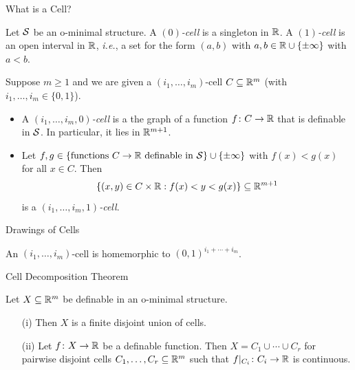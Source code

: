 \documentclass{beamer}
\begin{document}
\begin{frame}{What is a Cell?}
  \begin{definition}
    Let ${\mathcal S}$ be an o-minimal structure. 
    A \emph{$(0)$-cell} is a singleton in ${\mathbb{R}}$. A \emph{$(1)$-cell} is an open
    interval in ${\mathbb{R}}$, \textit{i.e.}, a set for the form $(a,b)$ with
    $a,b\in {\mathbb{R}}\cup\{\pm\infty\}$ with $a<b$.

    Suppose $m\ge 1$ and we are given a $(i_1,\ldots,i_m)$-cell
    $C\subseteq{\mathbb{R}}^m$
    (with $i_1,\ldots,i_m\in
    \{0,1\}$).  
    \begin{itemize}
    \item A \emph{$(i_1,\ldots,i_m,0)$-cell} is a the graph of a function
      $f\colon C\rightarrow {\mathbb{R}}$ that is definable in ${\mathcal S}$. In
      particular, it lies in ${\mathbb{R}}^{m+1}$.
    \item Let $f,g\in \{\text{functions }C\rightarrow {\mathbb{R}} \text{ definable
        in ${\mathcal S}$}\}\cup\{\pm\infty\}$  with $f(x) < g(x)$ for all $x\in C$. 
      Then
      \begin{equation*}
        \{(x,y)\in C\times {\mathbb{R}} : f(x) < y <
        g(x)  \}\subseteq{\mathbb{R}}^{m+1}
      \end{equation*}
      is a \emph{$(i_1,\ldots,i_m,1)$-cell}.
    \end{itemize}
  \end{definition}
\end{frame}

\begin{frame}{Drawings of Cells}

  \vspace{7cm}
  An $(i_1,\ldots,i_m)$-cell is homemorphic to $(0,1)^{i_1+\cdots+i_m}$.
\end{frame}

\begin{frame}{Cell Decomposition Theorem}
  \begin{theorem}
    Let $X\subseteq{\mathbb{R}}^m$ be
    definable in an o-minimal structure.
    \begin{enumerate}
    \item [(i)] Then $X$ is a
      finite disjoint union of cells.
    \item[(ii)] Let $f\colon X\rightarrow{\mathbb{R}}$ be 
      a definable function. Then $X=C_1\cup\cdots \cup C_r$ for pairwise
      disjoint cells $C_1,\ldots,C_r\subseteq{\mathbb{R}}^m$ such that
      $f|_{C_i}\colon C_i\rightarrow{\mathbb{R}}$ is continuous. 
    \end{enumerate}
  \end{theorem}
\end{frame}
\end{document}
